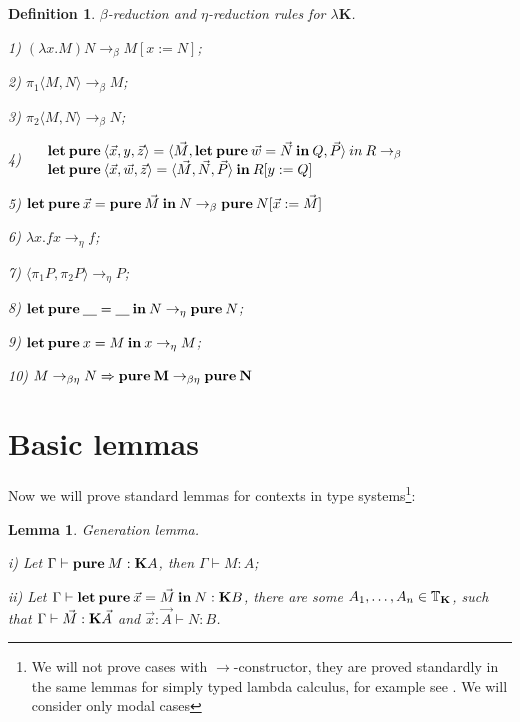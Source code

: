 \documentclass[a4paper]{article}
\newtheorem{lemma}{Lemma}
\newtheorem{defin}{Definition}
\begin{document}
  \begin{defin} $\beta$-reduction and $\eta$-reduction rules for \emph{$\lambda \textbf{K}$}.

  1) $(\lambda x. M) N \rightarrow_{\beta} M [x := N]$;

  2) $\pi_1 \langle M, N \rangle \rightarrow_{\beta} M$;

  3) $\pi_2 \langle M, N \rangle \rightarrow_{\beta} N$;

  4) $\begin{array}{llll}
  & {\bf let \: pure \:} \langle \vec{x}, y, \vec{z} \rangle = \langle \vec{M}, {\bf let \: pure \: } \vec{w} = \vec{N} {\bf \: in \: } Q, \vec{P} \rangle {\: in \:} R \rightarrow_{\beta} & \\
  & {\bf let \: pure \:} \langle \vec{x}, \vec{w}, \vec{z} \rangle = \langle \vec{M}, \vec{N}, \vec{P} \rangle \: { \bf in } \: R [y := Q]
  \end{array}$

  5) ${\bf let \: pure \:} \vec{x} = {\bf pure \:} \vec{M} {\: \bf in \:} N \rightarrow_{\beta} {\bf pure \:} N [\vec{x} := \vec{M}]$

  6) $\lambda x. f x \rightarrow_{\eta} f$;

  7) $\langle \pi_1 P, \pi_2 P \rangle \rightarrow_{\eta} P$;

  8) ${\bf let \: pure \:} \underline{\quad} = \underline{\quad} {\: \bf in \:} N \rightarrow_{\eta} {\bf pure \:} N$;

  9) ${\bf let \: pure \:} x = M {\: \bf in \: } x \rightarrow_{\eta} M$;

  10) $M \rightarrow_{\beta \eta} N \Rightarrow {\bf pure \: M} \rightarrow_{\beta \eta} {\bf pure \: N}$
  \end{defin}


  \section{Basic lemmas}

  Now we will prove standard lemmas for contexts in type systems\footnote{We will not prove cases with
  $\to$-constructor, they are proved standardly in the same lemmas for simply typed lambda calculus, for
  example see \cite{Neder}\cite{Morten}\cite{Girard}. We will consider only modal cases}:

\begin{lemma} Generation lemma.

  i) Let $\Gamma \vdash {\bf pure \:} M : {\bf K}A$, then $\Gamma \vdash M : A$;

  ii) Let $\Gamma \vdash {\bf let \: pure \:} \vec{x} = \vec{M} {\: \bf in \:} N : {\bf K}B$, there are some $A_1,\dots,A_n \in \mathbb{T}_{{\bf K}}$,
  such that $\Gamma \vdash \vec{M} : {\bf K} \vec{A}$ and $\vec{x} : \vec{A} \vdash N : B$.
\end{lemma}
\end{document}
